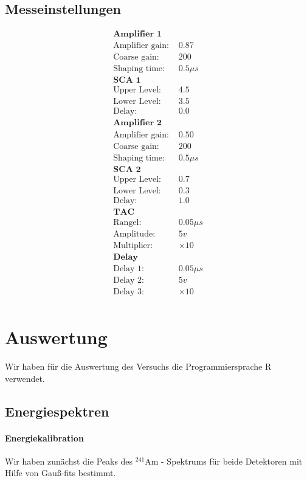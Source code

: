 \documentclass[12pt]{article}
\begin{document}
\subsection{Messeinstellungen}

\begin{align*}
\textbf{Amplifier 1}\\
\text{Amplifier gain: } & 0.87\\
\text{Coarse gain: } & 200\\
\text{Shaping time: } & 0.5\mu s\\
\textbf{SCA 1}\\
\text{Upper Level: } & 4.5\\
\text{Lower Level: } & 3.5\\
\text{Delay: } & 0.0\\
\textbf{Amplifier 2}\\
\text{Amplifier gain: } & 0.50\\
\text{Coarse gain: } & 200\\
\text{Shaping time: } & 0.5\mu s\\
\textbf{SCA 2}\\
\text{Upper Level: } & 0.7\\
\text{Lower Level: } & 0.3\\
\text{Delay: } & 1.0\\
\textbf{TAC}\\
\text{Rangel: } & 0.05\mu s\\
\text{Amplitude: } & 5 v\\
\text{Multiplier: } & \times 10\\
\textbf{Delay}\\
\text{Delay 1: } & 0.05\mu s\\
\text{Delay 2: } & 5 v\\
\text{Delay 3: } & \times 10\\
\end{align*}


\newpage
\section{Auswertung}

Wir haben für die Auswertung des Versuchs die Programmiersprache R verwendet.

\subsection{Energiespektren}

\paragraph{Energiekalibration} Wir haben zunächst die Peaks des $^{241}$Am - Spektrums für beide Detektoren mit Hilfe von Gauß-fits bestimmt.
\end{document}
